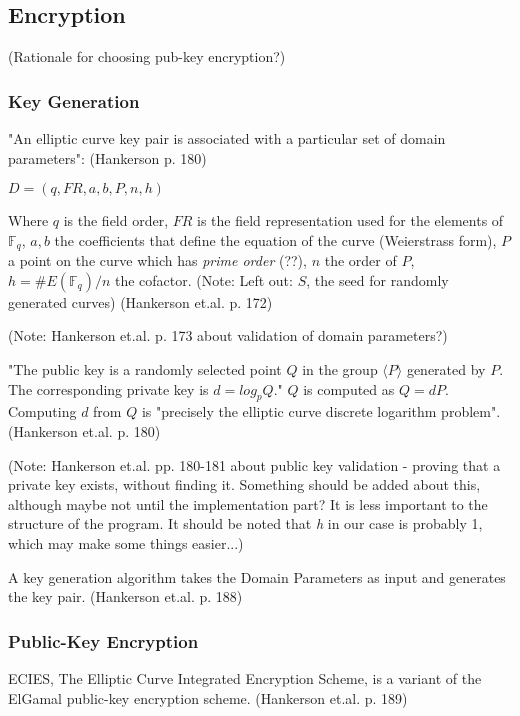 \subsection{Encryption}

(Rationale for choosing pub-key encryption?)

\subsubsection{Key Generation}

"An elliptic curve key pair is associated with a particular set of domain parameters": (Hankerson p. 180)

\( D = (q,FR,a,b,P,n,h) \)

Where \(q\) is the field order, \(FR\) is the field representation used for the elements of \( \mathbb{ F }_q \),
\(a, b\) the coefficients that define the equation of the curve (Weierstrass form), \(P\) a point on the curve which
has \emph{prime order} (??), \(n\) the order of \(P\), \(h = \#E(\mathbb{F}_q) / n\) the cofactor. (Note: Left out:
\(S\), the seed for randomly generated curves) (Hankerson et.al. p. 172)

(Note: Hankerson et.al. p. 173 about validation of domain parameters?)

"The public key is a randomly selected point \(Q\) in the group \( \langle P \rangle \) generated by \(P\). The corresponding
private key is \(d = log_p Q\)." \(Q\) is computed as \(Q = dP\). Computing \(d\) from \(Q\) is "precisely the elliptic curve
discrete logarithm problem". (Hankerson et.al. p. 180)

(Note: Hankerson et.al. pp. 180-181 about public key validation - proving that a private key exists, without finding it. Something
should be added about this, although maybe not until the implementation part? It is less important to the structure of the program.
It should be noted that \emph{h} in our case is probably 1, which may make some things easier...)

A key generation algorithm takes the Domain Parameters as input and generates the key pair. (Hankerson et.al. p. 188)

\subsubsection{Public-Key Encryption}

ECIES, The Elliptic Curve Integrated Encryption Scheme, is a variant of the ElGamal public-key encryption scheme. (Hankerson et.al. p. 189)